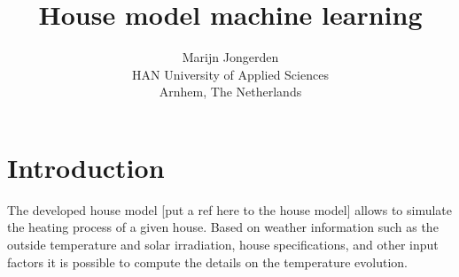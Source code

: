 

\title{House model machine learning}
\author{Marijn Jongerden\\
HAN University of Applied Sciences\\
Arnhem, The Netherlands}


	
\ldf  %


\ldf

\maketitle





\section{Introduction}\label{s:introduction}
The developed house model [put a ref here to the house model] allows to simulate the heating process of a given house. Based on weather information such as the outside temperature and solar irradiation, house specifications, and other input factors it is possible to compute the details on the temperature evolution. 

